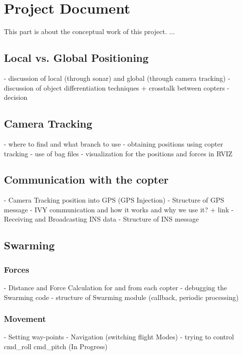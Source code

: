 \chapter{Project Document}\label{ch:ch2label}

This part is about the conceptual work of this project. ...

\section{Local vs. Global Positioning}
- discussion of local (through sonar) and global (through camera tracking) 
- discussion of object differentiation techniques + crosstalk between copters
- decision 

\section{Camera Tracking}
- where to find and what branch to use
- obtaining positions using copter tracking
- use of bag files
- visualization for the positions and forces in RVIZ

\section{Communication with the copter}
- Camera Tracking position into GPS (GPS Injection)
- Structure of GPS message
- IVY communication and how it works and why we use it? + link
- Receiving and Broadcasting INS data
- Structure of INS message 

\section{Swarming}

\subsection{Forces}
- Distance and Force Calculation for and from each copter
- debugging the Swarming code
- structure of Swarming module (callback, periodic processing)

\subsection{Movement}
- Setting way-points
- Navigation (switching flight Modes)
- trying to control cmd\_roll cmd\_pitch (In Progress) 
